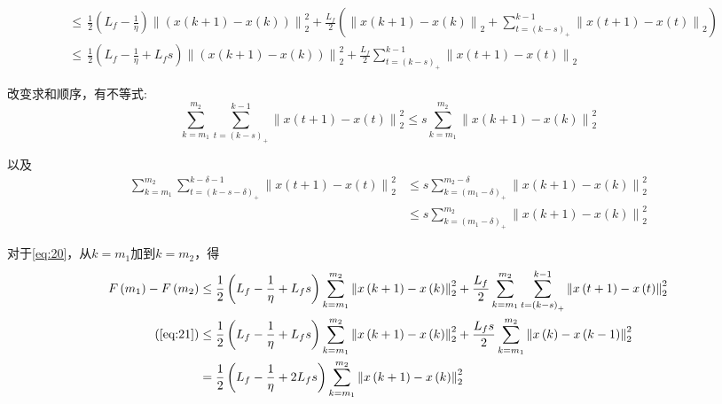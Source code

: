 \documentclass{ctexart}
\begin{document}
\begin{align}
  & \leq \, \frac{1}{2}\left(L_f - \frac{1}{\eta}\right)\left\| \left( x\left(k+1\right) - x\left(k\right) \right) \right\|_2^2 + \frac{L_f}{2} \left( \left\| x \left(k+1\right)-x \left(k\right) \right\|_2 +\sum\limits_{t=\left(k-s\right)_{+}}^{k-1} \left\| x \left(t+1\right)-x \left(t\right) \right\|_2 \right) \nonumber \\
  & \leq \, \frac{1}{2}\left(L_f - \frac{1}{\eta} + {L_f}s \right)\left\| \left( x\left(k+1\right) - x\left(k\right) \right) \right\|_2^2 + \frac{L_f}{2} \sum\limits_{t=\left(k-s\right)_{+}}^{k-1}\left\| x \left(t+1\right)-x \left(t\right) \right\|_2
\end{align}

改变求和顺序，有不等式:
\begin{equation}\label{eq:21}
    \sum\limits_{k=m_1}^{m_2} {\sum\limits_{t = \left(k-s\right)_{+}}^{k-1} {\left\| x\left(t+1\right) -  x\left(t\right) \right\|_2^2}} \leq s\sum\limits_{k=m_1}^{m_2}{\left\| x\left(k+1\right) - x\left(k\right)\right\|_2^2}
\end{equation}

以及
\begin{align}\label{eq:23}
    \sum\limits_{k=m_1}^{m_2}{\sum\limits_{t=\left(k-s-\delta \right)_{+}}^{k-\delta -1} {\left\| x\left(t+1\right) - x\left(t\right) \right\|_2^2}} & \leq s \sum\limits_{k=\left(m_1 - \delta\right)_{+}}^{m_2 -\delta}{\left\|x\left(k+1\right) - x\left(k\right) \right\|_2^2} \nonumber \\
    & \leq s \sum\limits_{k=\left(m_1 - \delta\right)_{+}}^{m_2} \left\| x\left(k+1\right) - x\left(k\right)\right\|_2^2
\end{align}

对于\ref{eq:20}，从$ k=m_1 $加到$ k=m_2 $，得
\begin{align}\label{eq:22}
  F \left(m_1\right)-F\left(m_2\right) &\leq \frac{1}{2}\left(L_f - \frac{1}{\eta}+{L_f}s \right)\sum\limits_{k=m_1}^{m_2} \left\| x\left(k+1\right) - x\left(k\right) \right\|_2^2 + \frac{L_f}{2}\sum\limits_{k=m_1}^{m_2} \sum_{t=\left( k-s \right)_+ }^{k-1} \left\| x\left(t+1\right) - x\left(t\right) \right\|_2^2 \nonumber \\
  \left( \ref{eq:21} \right) & \leq \frac{1}{2}\left(L_f - \frac{1}{\eta}+{L_f}s \right)\sum\limits_{k=m_1}^{m_2} \left\| x\left(k+1\right) - x\left(k\right) \right\|_2^2 + \frac{{L_f}s}{2} \sum\limits_{k=m_1}^{m_2} \left\| x\left(k\right) - x\left(k-1\right) \right\|_2^2 \nonumber \\
  & = \frac{1}{2}\left(L_f - \frac{1}{\eta} + 2{L_f}s \right) \sum\limits_{k=m_1}^{m_2} \left\| x\left(k+1\right)-x\left(k\right) \right\|_2^2
\end{align}
\end{document}
